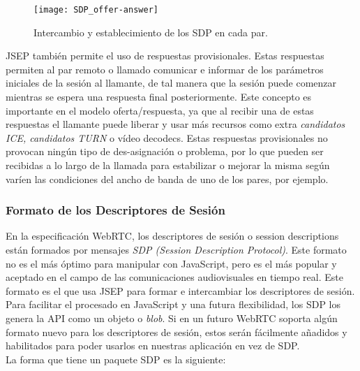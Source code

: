 \begin{figure}[htb]
\centering
\texttt{[image: SDP\_offer-answer]}
\caption{Intercambio y establecimiento de los SDP en cada par.}
\label{fig:sdp-oferta-respuesta}
\end{figure}

JSEP también permite el uso de respuestas provisionales. Estas respuestas permiten al par remoto o llamado comunicar e informar de los parámetros iniciales de la sesión al llamante, de tal manera que la sesión puede comenzar mientras se espera una respuesta final posteriormente. Este concepto es importante en el modelo oferta/respuesta, ya que al recibir una de estas respuestas el llamante puede liberar y usar más recursos como extra \textit{candidatos ICE, candidatos TURN} o vídeo decodecs. Estas respuestas provisionales no provocan ningún tipo de des-asignación o problema, por lo que pueden ser recibidas a lo largo de la llamada para estabilizar o mejorar la misma según varíen las condiciones del ancho de banda de uno de los pares, por ejemplo.\\


\subsubsection{Formato de los Descriptores de Sesión}

En la especificación WebRTC, los descriptores de sesión o session descriptions están formados por mensajes \textit{SDP (Session Description Protocol)}. Este formato no es el más óptimo para manipular con JavaScript, pero es el más popular y aceptado en el campo de las comunicaciones audiovisuales en tiempo real. Este formato es el que usa JSEP para formar e intercambiar los descriptores de sesión.\\

Para facilitar el procesado en JavaScript y una futura flexibilidad, los SDP los genera la API como un objeto o \textit{blob}. Si en un futuro WebRTC soporta algún formato nuevo para los descriptores de sesión, estos serán fácilmente añadidos y habilitados para poder usarlos en nuestras aplicación en vez de SDP.\\

La forma que tiene un paquete SDP es la siguiente:

